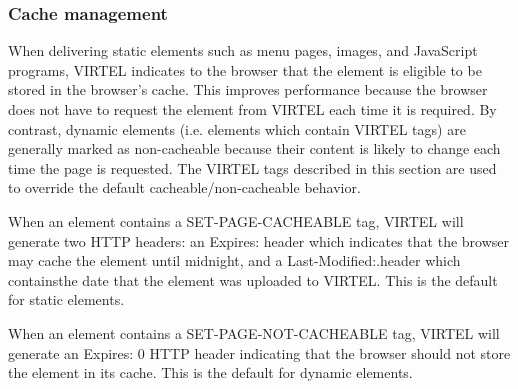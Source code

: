 \documentclass[letterpaper,10pt,english]{sphinxmanual}
\begin{document}
\subsubsection{Cache management}
\label{\detokenize{User_Guide:cache-management}}

When delivering static elements such as menu pages, images, and JavaScript programs, VIRTEL indicates to the browser that the element is eligible to be stored in the browser’s cache. This improves performance because the browser does not have to request the element from VIRTEL each time it is required. By contrast, dynamic elements (i.e. elements which contain VIRTEL tags) are generally marked as non-cacheable because their content is likely to
change each time the page is requested. The VIRTEL tags described in this section are used to override the default cacheable/non-cacheable behavior.


\begin{sphinxVerbatim}[commandchars=\\\{\}]
  
\end{sphinxVerbatim}

When an element contains a SET-PAGE-CACHEABLE tag, VIRTEL will generate two HTTP headers: an Expires: header which indicates that the browser may cache the element until midnight, and a Last-Modified:.header which containsthe date that the element was uploaded to VIRTEL. This is the default for static elements.


\begin{sphinxVerbatim}[commandchars=\\\{\}]
  
\end{sphinxVerbatim}

When an element contains a SET-PAGE-NOT-CACHEABLE tag, VIRTEL will generate an Expires: 0 HTTP header indicating that the browser should not store the element in its cache. This is the default for dynamic elements.
\end{document}
